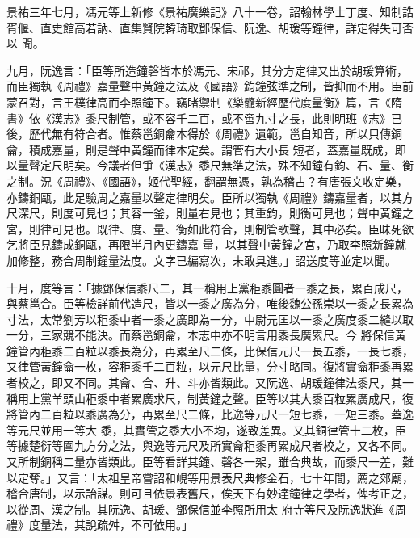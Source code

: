 
\begin{pinyinscope}

 景祐三年七月，馮元等上新修《景祐廣樂記》八十一卷，詔翰林學士丁度、知制誥胥偃、直史館高若訥、直集賢院韓琦取鄧保信、阮逸、胡瑗等鐘律，詳定得失可否以
 聞。



 九月，阮逸言：「臣等所造鐘磬皆本於馮元、宋祁，其分方定律又出於胡瑗算術，而臣獨執《周禮》嘉量聲中黃鐘之法及《國語》鈞鐘弦準之制，皆抑而不用。臣前蒙召對，言王樸律高而李照鐘下。竊睹禦制《樂髓新經歷代度量衡》篇，言《隋書》依《漢志》黍尺制管，或不容千二百，或不啻九寸之長，此則明班《志》已後，歷代無有符合者。惟蔡邕銅龠本得於《周禮》遺範，邕自知音，所以只傳銅龠，積成嘉量，則是聲中黃鐘而律本定矣。謂管有大小長
 短者，蓋嘉量既成，即以量聲定尺明矣。今議者但爭《漢志》黍尺無準之法，殊不知鐘有鈞、石、量、衡之制。況《周禮》、《國語》，姬代聖經，翻謂無憑，孰為稽古？有唐張文收定樂，亦鑄銅甌，此足驗周之嘉量以聲定律明矣。臣所以獨執《周禮》鑄嘉量者，以其方尺深尺，則度可見也；其容一釜，則量右見也；其重鈞，則衡可見也；聲中黃鐘之宮，則律可見也。既律、度、量、衡如此符合，則制管歌聲，其中必矣。臣昧死欲乞將臣見鑄成銅甌，再限半月內更鑄嘉
 量，以其聲中黃鐘之宮，乃取李照新鐘就加修整，務合周制鐘量法度。文字已編寫次，未敢具進。」詔送度等並定以聞。



 十月，度等言：「據鄧保信黍尺二，其一稱用上黨秬黍圓者一黍之長，累百成尺，與蔡邕合。臣等檢詳前代造尺，皆以一黍之廣為分，唯後魏公孫崇以一黍之長累為寸法，太常劉芳以秬黍中者一黍之廣即為一分，中尉元匡以一黍之廣度黍二縫以取一分，三家競不能決。而蔡邕銅龠，本志中亦不明言用黍長廣累尺。今
 將保信黃鐘管內秬黍二百粒以黍長為分，再累至尺二條，比保信元尺一長五黍，一長七黍，又律管黃鐘龠一枚，容秬黍千二百粒，以元尺比量，分寸略同。復將實龠秬黍再累者校之，即又不同。其龠、合、升、斗亦皆類此。又阮逸、胡瑗鐘律法黍尺，其一稱用上黨羊頭山秬黍中者累廣求尺，制黃鐘之聲。臣等以其大黍百粒累廣成尺，復將管內二百粒以黍廣為分，再累至尺二條，比逸等元尺一短七黍，一短三黍。蓋逸等元尺並用一等大
 黍，其實管之黍大小不均，遂致差異。又其銅律管十二枚，臣等據楚衍等圍九方分之法，與逸等元尺及所實龠秬黍再累成尺者校之，又各不同。又所制銅稱二量亦皆類此。臣等看詳其鐘、磬各一架，雖合典故，而黍尺一差，難以定奪。」又言：「太祖皇帝嘗詔和峴等用景表尺典修金石，七十年間，薦之郊廟，稽合唐制，以示詒謀。則可且依景表舊尺，俟天下有妙達鐘律之學者，俾考正之，以從周、漢之制。其阮逸、胡瑗、鄧保信並李照所用太
 府寺等尺及阮逸狀進《周禮》度量法，其說疏舛，不可依用。」




\end{pinyinscope}

